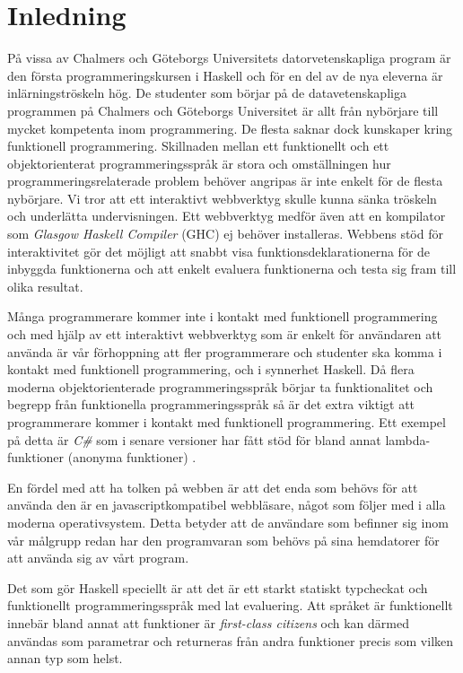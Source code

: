 \section{Inledning}
På vissa av Chalmers och Göteborgs Universitets datorvetenskapliga program är den första programmeringskursen i Haskell \citep{haskell98} och för en del av de nya eleverna är inlärningströskeln hög. De studenter som börjar på de datavetenskapliga programmen på Chalmers och Göteborgs Universitet är allt från nybörjare till mycket kompetenta inom programmering. De flesta saknar dock kunskaper kring funktionell programmering. Skillnaden mellan ett funktionellt och ett objektorienterat programmeringsspråk är stora och omställningen hur programmeringsrelaterade problem behöver angripas  är inte enkelt för de flesta nybörjare. Vi tror att ett interaktivt webbverktyg skulle kunna sänka tröskeln och underlätta undervisningen. Ett webbverktyg medför även att en kompilator som \emph{Glasgow Haskell Compiler} (GHC) \citep{ghc} ej behöver installeras. Webbens stöd för interaktivitet gör det möjligt att snabbt visa funktionsdeklarationerna för de inbyggda funktionerna och att enkelt evaluera funktionerna och testa sig fram till olika resultat.

Många programmerare kommer inte i kontakt med funktionell programmering  och med hjälp av ett interaktivt webbverktyg som är enkelt för användaren att använda är vår förhoppning att fler programmerare och studenter ska komma i kontakt med funktionell programmering, och i synnerhet Haskell. Då flera moderna objektorienterade programmeringsspråk börjar ta funktionalitet och begrepp från funktionella programmeringsspråk så är det extra viktigt att programmerare kommer i kontakt med funktionell programmering. Ett exempel på detta är \emph{C\#} som i senare versioner har fått stöd för bland annat lambda-funktioner (anonyma funktioner) \citep{csharp}. 

En fördel med att ha tolken på webben är att det enda som behövs för att använda den är en javascriptkompatibel webbläsare, något som följer med i alla moderna operativsystem. Detta betyder att de användare som befinner sig inom vår målgrupp redan har den programvaran som behövs på sina hemdatorer för att använda sig av vårt program.  

Det som gör Haskell speciellt är att det är ett starkt statiskt typcheckat och funktionellt programmeringsspråk med lat evaluering. %
Att språket är funktionellt innebär bland annat att funktioner är \emph{first-class citizens} och kan därmed användas som parametrar och returneras från andra funktioner precis som vilken annan typ som helst.

